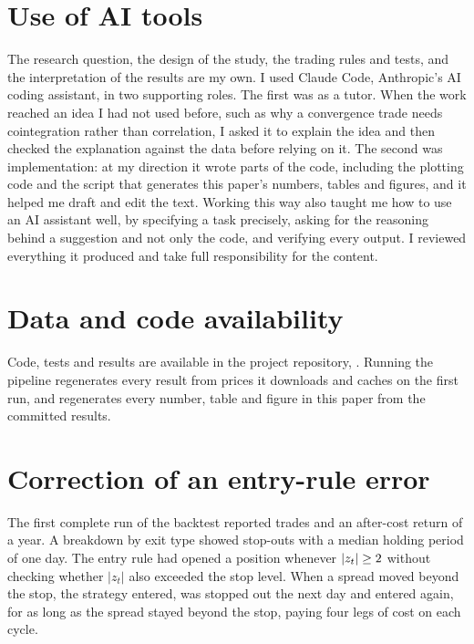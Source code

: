 \documentclass[11pt]{article}
\begin{document}
\section*{Use of AI tools}

The research question, the design of the study, the trading rules and tests, and
the interpretation of the results are my own. I used Claude Code, Anthropic's AI
coding assistant, in two supporting roles. The first was as a tutor. When the work
reached an idea I had not used before, such as why a convergence trade needs
cointegration rather than correlation, I asked it to explain the idea and then
checked the explanation against the data before relying on it. The second was implementation: at my direction it wrote parts of the code,
including the plotting code and the script that generates this paper's numbers,
tables and figures, and it helped me draft and edit the text. Working this way also
taught me how to use an AI assistant well, by specifying a task precisely, asking
for the reasoning behind a suggestion and not only the code, and verifying every
output. I reviewed everything it produced and take full responsibility for the
content.

\section*{Data and code availability}

Code, tests and results are available in the project repository,
. Running the
pipeline regenerates every result from prices it downloads and caches on the first
run, and  regenerates every number, table and
figure in this paper from the committed results.




\appendix
\section{Correction of an entry-rule error}\label{app:fix}

The first complete run of the backtest reported \OldTrades{} trades and an after-cost
return of \OldNet{} a year. A breakdown by exit type showed \OldStops{} stop-outs with
a median holding period of one day. The entry rule had opened a position whenever
$|z_t| \ge 2$ without checking whether $|z_t|$ also exceeded the stop level. When
a spread moved beyond the stop, the strategy entered, was stopped out the next day
and entered again, for as long as the spread stayed beyond the stop, paying four legs
of cost on each cycle.
\end{document}
